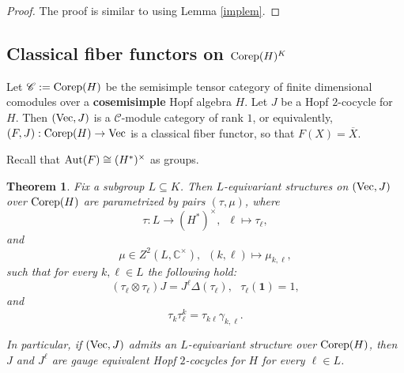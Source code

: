 \documentclass{amsart}
\newtheorem{theorem}{Theorem}[section]
\theoremstyle{definition}
\newcommand{\Vect}{{\rm Vec}}
\newcommand{\C}{\mathscr{C}}
\newcommand{\ot}{\otimes}
\numberwithin{equation}{section}
\begin{document}
\begin{proof}
The proof is similar to \cite[Proposition 5.4]{ENO} using Lemma \ref{implem}. 
\end{proof}

\subsection{Classical fiber functors on ${\rm Corep}(H)^K$}\label{sec:Fiber functors}
Let $\C:={\rm Corep}(H)$ be the semisimple tensor category of finite dimensional comodules over a {\bf cosemisimple} Hopf algebra $H$. Let $J$ be a Hopf $2$-cocycle for $H$. Then $(\Vect,J)$ 
is a $\C$-module category of rank $1$, or equivalently, $(F,J):{\rm Corep}(H)\to \Vect$ is a classical fiber functor, so that $F(X)=\overline{X}$. 

Recall that ${\rm Aut}(F)\cong (H^*)^{\times}$ as groups.

\begin{theorem}\label{partaunewgen}
Fix a subgroup $L\subseteq K$. 
Then $L$-equivariant structures on $(\Vect,J)$ over ${\rm Corep}(H)$ are parametrized by pairs $(\tau,\mu)$, where 
\begin{equation}\label{taufirsttgen}
\tau: L\to (H^*)^{\times},\,\,\,\ell\mapsto \tau_{\ell},
\end{equation}
and
\begin{equation}\label{mufirstt0gen}
\mu\in Z^2(L,\mathbb{C}^{\times}),\,\,\,(k,\ell)\mapsto \mu_{k,\ell},
\end{equation}
such that for every $k,\ell\in L$ the following hold:
\begin{equation}\label{taulPsigen}
(\tau_{\ell}\ot\tau_{\ell})J= J^{\ell}\Delta(\tau_{\ell}),\,\,\,\,
\tau_{\ell}(\mathbf{1})=1,
\end{equation}
and
\begin{equation}\label{Ultaulgen}
\tau_k\tau_{\ell}^k=\tau_{k\ell}\gamma_{k,\ell}.
\end{equation}

In particular, if $(\Vect,J)$ admits an $L$-equivariant structure over ${\rm Corep}(H)$, then $J$ and $J^{\ell}$ are gauge equivalent Hopf $2$-cocycles for $H$ for every $\ell\in L$. 
\end{theorem}
\end{document}
